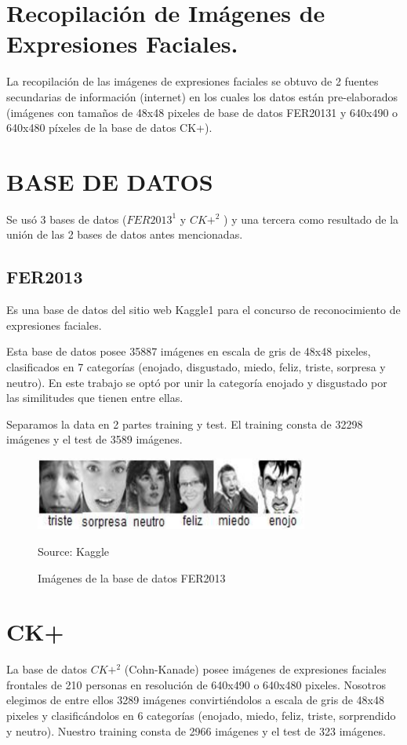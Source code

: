\section{Recopilación de Imágenes de Expresiones Faciales.}
La recopilación de las imágenes de expresiones faciales se obtuvo de 2 fuentes
secundarias de información (internet) en los cuales los datos están pre-elaborados
(imágenes con tamaños de 48x48 pixeles de base de datos FER20131 y 640x490 o
640x480 píxeles de la base de datos CK+).

\section{BASE DE DATOS}
Se usó 3 bases de datos ($FER2013^{1}$ y $CK+^{2}$ ) y una tercera como resultado de la
unión de las 2 bases de datos antes mencionadas.
\subsection{FER2013}
Es una base de datos del sitio web Kaggle{1} para el concurso de reconocimiento de
expresiones faciales.

Esta base de datos posee 35887 imágenes en escala de gris de 48x48 pixeles,
clasificados en 7 categorías (enojado, disgustado, miedo, feliz, triste, sorpresa y neutro).
En este trabajo se optó por unir la categoría enojado y disgustado por las similitudes que
tienen entre ellas.

Separamos la data en 2 partes training y test. El training consta de 32298 imágenes
y el test de 3589 imágenes.

\begin{figure}[H]
		\centering
		\includegraphics[width=90mm]{Imagenes/imagenes_fer.png}
		\caption{Imágenes de la base de datos FER2013}
		Source: Kaggle
		\label{fig:imagenes_fer}
\end{figure}

\section{CK+}
La base de datos $CK+^{2}$ (Cohn-Kanade) posee imágenes de expresiones faciales
frontales de 210 personas en resolución de 640x490 o 640x480 pixeles. Nosotros
elegimos de entre ellos 3289 imágenes convirtiéndolos a escala de gris de 48x48 pixeles
y clasificándolos en 6 categorías (enojado, miedo, feliz, triste, sorprendido y neutro).
Nuestro training consta de 2966 imágenes y el test de 323 imágenes.

